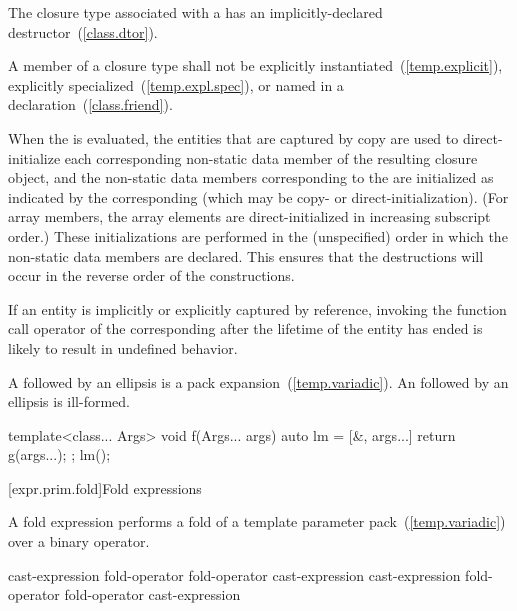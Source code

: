 \pnum
The closure type associated with a  has an
implicitly-declared destructor~(\ref{class.dtor}).

\pnum
A member of a closure type shall not be
explicitly instantiated~(\ref{temp.explicit}),
explicitly specialized~(\ref{temp.expl.spec}), or
named in a  declaration~(\ref{class.friend}).

\pnum
When the  is evaluated, the entities that are
captured by copy are used to direct-initialize each corresponding non-static data member
of the resulting closure object, and the non-static data members corresponding to the
 are initialized as indicated by the corresponding
 (which may be copy- or direct-initialization). (For array members, the array elements are
direct-initialized in increasing subscript order.) These initializations are performed
in the (unspecified) order in which the non-static data members are declared. \enternote
This ensures that the destructions will occur in the reverse order of the constructions.
\exitnote

\pnum
\enternote If an entity is implicitly or explicitly captured by reference,
invoking the function call operator of the corresponding 
after the lifetime of the entity has ended is likely to result in undefined behavior.
\exitnote

\pnum
A  followed by an ellipsis is a pack
expansion~(\ref{temp.variadic}). An  followed by an
ellipsis is ill-formed.
\enterexample
\begin{codeblock}
template<class... Args>
void f(Args... args) {
  auto lm = [&, args...] { return g(args...); };
  lm();
}
\end{codeblock}
\exitexample%
%

[expr.prim.fold]{Fold expressions}%

\pnum
A fold expression performs a fold of a template parameter
pack~(\ref{temp.variadic}) over a binary operator.

\begin{bnf}
\br
    \terminal{(} cast-expression fold-operator  \terminal{)}\br
    \terminal{(}  fold-operator cast-expression \terminal{)}\br
    \terminal{(} cast-expression fold-operator  fold-operator cast-expression \terminal{)}
\end{bnf}

